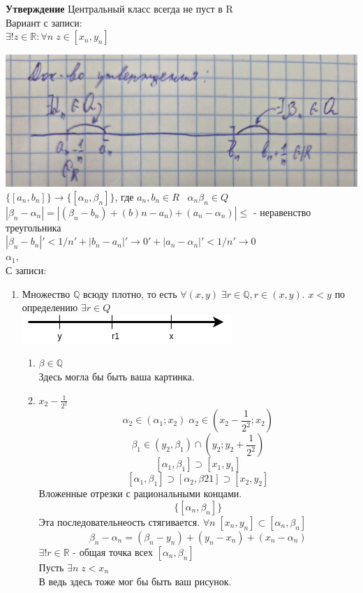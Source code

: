 \documentclass[12pt, paper]{article}
\newcommand{\Q}{\mathbb{Q}}
\newcommand{\R}{\mathbb{R}}
\begin{document}
\begin{tcolorbox}
    \textbf{Утверждение}
    Центральный класс всегда не пуст в R\\
    Вариант с записи: \\
    $\exists!z\in\R: \forall n\; z\in [x_n, y_n]$
\end{tcolorbox}

\begin{tcolorbox}[title=Доказательство., breakable]
    \includegraphics[width=0.5\linewidth]{Док-во утверждения об отрезках.png}\\
    $\{ [a_n,b_n] \} \rightarrow \{ [\alpha_n,\beta_n] \}$, где $a_n,b_n \in R\;\;\; \alpha_n\beta_n \in Q$\\
    $|\beta_n - \alpha_n| = |(\beta_n - b_n)+(b)n-a_n)+(a_n-\alpha_n)| \leq$ - неравенство треугольника\\ 
    $|\beta_n-b_n|'<1/n'+|b_n-a_n|'\rightarrow 0' +|a_n-\alpha_n| '<1/n' \rightarrow 0$\\
    $\alpha_1,\ $\\

    С записи:\\
    \begin{enumerate}
        \item Множество $\Q$ всюду плотно, то есть $\forall (x, y)\; \exists r\in \Q, r\in (x, y)$. $x < y$ по определению $\exists r \in Q$\\ 
        \includegraphics[width=0.5\linewidth]{images/Вложенные отрезки/Доказательство плотность множества Q.png}
	\begin{enumerate}
		\item  $\beta \in \Q$\\
		Здесь могла бы быть ваша картинка.
	        \item $ x_2 - \frac{1}{2^2}$ 
	\[ \alpha_2 \in (\alpha_1; x_2) \;  \alpha_2 \in (x_2 - \frac{1}{2^2}; x_2) \]
	\[ \beta_1 \in (y_2, \beta_1) \cap (y_2; y_2 + \frac{1}{2^2}) \] 
	\[ [\alpha_1, \beta_1] \supset [x_1, y_1] \]
	\[ [\alpha_1, \beta_1] \supset [\alpha_2, \beta21] \supset [x_2, y_2] \]
	Вложенные отрезки с рациональными концами.
	\[ \{ [ \alpha_n, \beta_n ] \} \]
	Эта последовательнеость стягивается. $ \forall n\; [x_n, y_n] \subset [\alpha_n, \beta_n] $\\
	\[ \beta_n - \alpha_n = (\beta_n - y_n) + (y_n - x_n) + (x_n - \alpha_n) \]
         $ \exists! r \in \R $ - общая точка всех $[\alpha_n, \beta_n]$\\
	 Пусть $\exists n \; z < x_n$\\
	 В ведь здесь тоже мог бы быть ваш рисунок.
	\end{enumerate}
\end{enumerate}
\end{tcolorbox}
\end{document}
